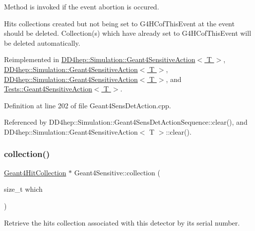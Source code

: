 Method is invoked if the event abortion is occured.

Hits collections created but not being set to G4\+H\+Cof\+This\+Event at the event should be deleted. Collection(s) which have already set to G4\+H\+Cof\+This\+Event will be deleted automatically. 

Reimplemented in \hyperlink{class_d_d4hep_1_1_simulation_1_1_geant4_sensitive_action_a52a9e46a54f3e1605637dc281a878b0d}{D\+D4hep\+::\+Simulation\+::\+Geant4\+Sensitive\+Action$<$ T $>$}, \hyperlink{class_d_d4hep_1_1_simulation_1_1_geant4_sensitive_action_ad6662339c480efeb52af63c13fe6cc88}{D\+D4hep\+::\+Simulation\+::\+Geant4\+Sensitive\+Action$<$ T $>$}, \hyperlink{class_d_d4hep_1_1_simulation_1_1_geant4_sensitive_action_a37038afed1f3cc353e9b16a264d505ec}{D\+D4hep\+::\+Simulation\+::\+Geant4\+Sensitive\+Action$<$ T $>$}, and \hyperlink{class_tests_1_1_geant4_sensitive_action_a4d02434822c244ee5c5d6aee7e15c993}{Tests\+::\+Geant4\+Sensitive\+Action$<$ T $>$}.



Definition at line 202 of file Geant4\+Sens\+Det\+Action.\+cpp.



Referenced by D\+D4hep\+::\+Simulation\+::\+Geant4\+Sens\+Det\+Action\+Sequence\+::clear(), and D\+D4hep\+::\+Simulation\+::\+Geant4\+Sensitive\+Action$<$ T $>$\+::clear().

\hypertarget{class_d_d4hep_1_1_simulation_1_1_geant4_sensitive_a49d2a794d7824475b7bac71d7342306b}{}\label{class_d_d4hep_1_1_simulation_1_1_geant4_sensitive_a49d2a794d7824475b7bac71d7342306b} 
\subsubsection{\texorpdfstring{collection()}{collection()}}
{\footnotesize\ttfamily \hyperlink{class_d_d4hep_1_1_simulation_1_1_geant4_hit_collection}{Geant4\+Hit\+Collection} $\ast$ Geant4\+Sensitive\+::collection (\begin{DoxyParamCaption}\item[{size\+\_\+t}]{which }\end{DoxyParamCaption})}



Retrieve the hits collection associated with this detector by its serial number. 



